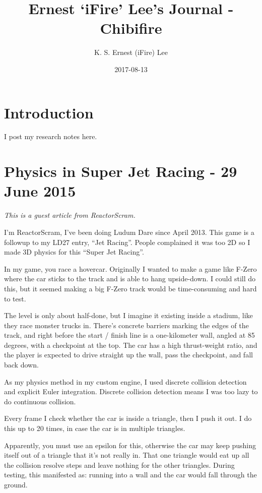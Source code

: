 \documentclass[]{book}
\title{Ernest `iFire' Lee's Journal - Chibifire}
\author{K. S. Ernest (iFire) Lee}
\date{2017-08-13}
\begin{document}
\maketitle

{
\setcounter{tocdepth}{1}
\tableofcontents
}
\chapter{Introduction}\label{intro}

I post my research notes here.

\chapter{Physics in Super Jet Racing - 29 June
2015}\label{physics-in-super-jet-racing---29-june-2015}

\emph{This is a guest article from ReactorScram.}

I'm ReactorScram, I've been doing Ludum Dare since April 2013. This game
is a followup to my LD27 entry, ``Jet Racing''. People complained it was
too 2D so I made 3D physics for this ``Super Jet Racing''.

In my game, you race a hovercar. Originally I wanted to make a game like
F-Zero where the car sticks to the track and is able to hang
upside-down. I could still do this, but it seemed making a big F-Zero
track would be time-consuming and hard to test.

The level is only about half-done, but I imagine it existing inside a
stadium, like they race monster trucks in. There's concrete barriers
marking the edges of the track, and right before the start / finish line
is a one-kilometer wall, angled at 85 degrees, with a checkpoint at the
top. The car has a high thrust-weight ratio, and the player is expected
to drive straight up the wall, pass the checkpoint, and fall back down.

As my physics method in my custom engine, I used discrete collision
detection and explicit Euler integration. Discrete collision detection
means I was too lazy to do continuous collision.

Every frame I check whether the car is inside a triangle, then I push it
out. I do this up to 20 times, in case the car is in multiple triangles.

Apparently, you must use an epsilon for this, otherwise the car may keep
pushing itself out of a triangle that it's not really in. That one
triangle would eat up all the collision resolve steps and leave nothing
for the other triangles. During testing, this manifested as: running
into a wall and the car would fall through the ground.
\end{document}
